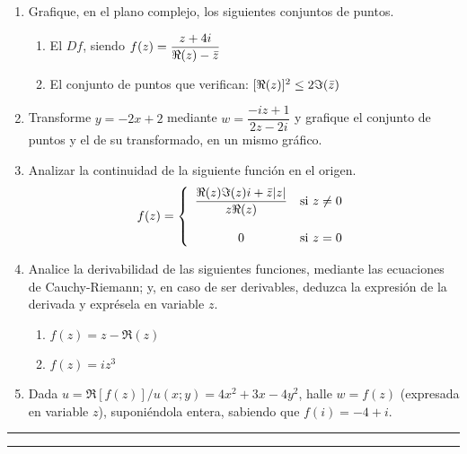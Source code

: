 \documentclass[9pt,a4paper]{extarticle}
\begin{document}
\begin{enumerate}
\item Grafique, en el plano complejo, los siguientes conjuntos de puntos.
\begin{enumerate}
    \item El $Df$, siendo $f(z)=\dfrac{z+4i}{\Re(z)-\Bar{z}}$
    \item El conjunto de puntos que verifican: $[\Re(z)]^2 \leq 2 \Im(\Bar{z})$
\end{enumerate}
\item Transforme $y=-2x+2$ mediante $w=\dfrac{-iz+1}{2z-2i}$ y grafique el conjunto de puntos y el de su transformado, en un mismo gráfico.
\item Analizar la continuidad de la siguiente función en el origen.
$$
     f(z) = \left\{
	       \begin{array}{cc}
		 \dfrac{\Re(z) \Im(z)i+\Bar{z}|z|}{z\Re(z)}      & \mathrm{si\ } z \neq 0 \\
		 &\\
		 0     & \mathrm{si\ } z = 0
	       \end{array}
	     \right.
$$
\item Analice la derivabilidad de las siguientes funciones, mediante las ecuaciones de Cauchy-Riemann; y, en caso de ser derivables, deduzca la expresión de la derivada y exprésela en variable $z$.
\begin{enumerate}
    \item $f(z)=z-\Re(z)$
    \item $f(z)=iz^3$
\end{enumerate}
\item Dada $u=\Re[f(z)]/u(x;y)=4x^2+3x-4y^2$, halle $w=f(z)$ (expresada en variable $z$), suponiéndola entera, sabiendo que $f(i)=-4+i$.
\end{enumerate}
\hrule
\newpage
\hrule
\end{document}
